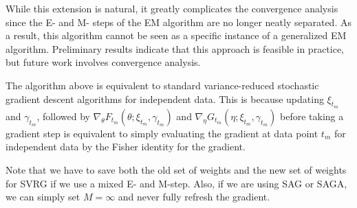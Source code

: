 While this extension is natural, it greatly complicates the convergence analysis since the E- and M- steps of the EM algorithm are no longer neatly separated. As a result, this algorithm cannot be seen as a specific instance of a generalized EM algorithm. Preliminary results indicate that this approach is feasible in practice, but future work involves convergence analysis.


The algorithm above is equivalent to standard variance-reduced stochastic gradient descent algorithms for independent data. This is because updating $\xi_{t_m}$ and $\gamma_{t_m}$, followed by $\nabla_{\theta} F_{t_m}(\theta;\xi_{t_m},\gamma_{t_m})$ and $\nabla_{\eta} G_{t_m}(\eta;\xi_{t_m},\gamma_{t_m})$ before taking a gradient step is equivalent to simply evaluating the gradient at data point $t_m$ for independent data by the Fisher identity for the gradient.

Note that we have to save both the old set of weights and the new set of weights for SVRG if we use a mixed E- and M-step. Also, if we are using SAG or SAGA, we can simply set $M = \infty$ and never fully refresh the gradient.
